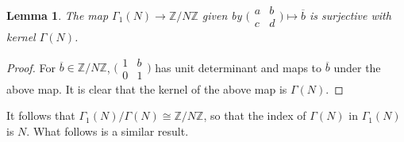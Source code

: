 \documentclass[10pt,leqno,twoside]{article}
\theoremstyle{plain}
\newtheorem{lemma}[lem]{Lemma}
\theoremstyle{definition}
\numberwithin{equation}{section}
\numberwithin{lem}{section}
\newcommand{\smod}[1]{\;(\bmod\; #1)}
\newcommand{\smallabcd}{\big(\!\begin{smallmatrix}
    a & b \\ c & d
\end{smallmatrix}\!\big)}
\begin{document}
\begin{lemma}\label{lem: principal normal in gamma 1}
    The map $\varGamma_1(N)\to \mathbb{Z}/N\mathbb{Z}$ given by $\smallabcd\mapsto \overline b$ is surjective with kernel $\varGamma(N)$. 
\end{lemma}
\begin{proof}
    For $\overline b\in\mathbb{Z}/N\mathbb{Z}$, $\big(\!\begin{smallmatrix}
        1 & b \\ 0 & 1
    \end{smallmatrix}\!\big)$ has unit determinant and maps to $\overline b$ under the above map. It is clear that the kernel of the above map is $\varGamma(N)$.
\end{proof} 
It follows that $\varGamma_1(N)/\varGamma(N)\cong \mathbb{Z}/N\mathbb{Z}$, so that the index of $\varGamma(N)$ in $\varGamma_1(N)$ is $N$. What follows is a similar result.
\end{document}
